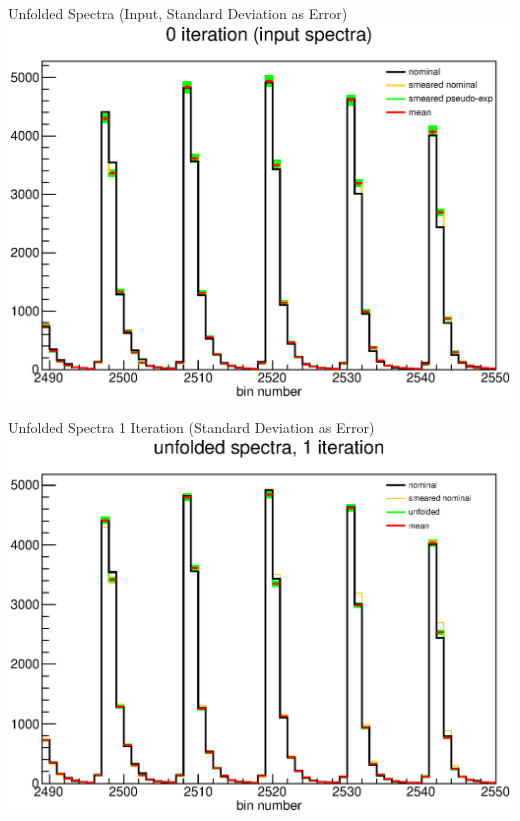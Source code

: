 \documentclass[aspectratio=169]{beamer}
\begin{document}
\begin{frame}{Unfolded Spectra (Input, Standard Deviation as Error)}
  \centering
  \includegraphics[height=\textheight]{figures/unfolded_pseudo_exps_iter0.eps}
\end{frame}

\begin{frame}{Unfolded Spectra 1 Iteration (Standard Deviation as Error)}
  \centering
  \includegraphics[height=\textheight]{figures/unfolded_pseudo_exps_iter1.eps}
\end{frame}
\end{document}
